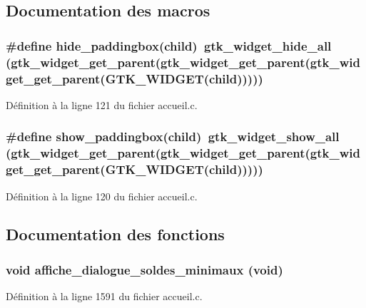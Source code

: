 \subsection{Documentation des macros}
\subsubsection[{hide\_\-paddingbox}]{\setlength{\rightskip}{0pt plus 5cm}\#define hide\_\-paddingbox(child)~gtk\_\-widget\_\-hide\_\-all (gtk\_\-widget\_\-get\_\-parent(gtk\_\-widget\_\-get\_\-parent(gtk\_\-widget\_\-get\_\-parent(GTK\_\-WIDGET(child)))))}\label{accueil_8c_a02da9b42f805679eb687619a1dc2aa71}


Définition à la ligne 121 du fichier accueil.c.

\subsubsection[{show\_\-paddingbox}]{\setlength{\rightskip}{0pt plus 5cm}\#define show\_\-paddingbox(child)~gtk\_\-widget\_\-show\_\-all (gtk\_\-widget\_\-get\_\-parent(gtk\_\-widget\_\-get\_\-parent(gtk\_\-widget\_\-get\_\-parent(GTK\_\-WIDGET(child)))))}\label{accueil_8c_ab03f50b500134428099c1983259a4957}


Définition à la ligne 120 du fichier accueil.c.



\subsection{Documentation des fonctions}
\subsubsection[{affiche\_\-dialogue\_\-soldes\_\-minimaux}]{\setlength{\rightskip}{0pt plus 5cm}void affiche\_\-dialogue\_\-soldes\_\-minimaux (void)}\label{accueil_8c_a14c0d85dd53f652a98e6a0ff81d9123b}


Définition à la ligne 1591 du fichier accueil.c.

